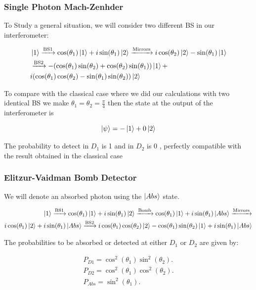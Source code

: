 \documentclass[]{beamer}
\begin{document}
\begin{frame}
\frametitle{Single Photon Mach-Zenhder}


To Study a general situation, we will consider two different BS in our interferometer: 

\begin{align*}
& \ket{1}\xrightarrow{\text{BS1}}\cos(\theta_{1})\ket{1}+i\sin(\theta_{1})\ket{2}\xrightarrow{\text{Mirrors}}i\cos(\theta_{2})\ket{2}-\sin(\theta_{1})\ket{1}\\
&\xrightarrow{\text{BS2}} -(\cos(\theta_{1})\sin(\theta_{2})+\cos(\theta_{2})\sin(\theta_{1}))\ket{1}+\\
& i(\cos(\theta_{1})\cos(\theta_{2})-\sin(\theta_{1})\sin(\theta_{2}))\ket{2} 
\end{align*}


To compare with the classical case where we did our calculations with two identical BS we make $\theta_{1}=\theta_{2}=\frac{\pi}{4}$ then the state at the output of the interferometer is 

\begin{equation}
\ket{\psi}=-\ket{1}+0\ket{2}
\end{equation}

The probability to detect in $D_{1}$ is 1 and in $D_{2}$ is 0 , perfectly compatible with the result obtained in the classical case 

\end{frame}

\begin{frame}
\frametitle{Elitzur-Vaidman Bomb Detector}
We will denote an absorbed photon using the $\ket{Abs}$ state.
  
\begin{align*}
\ket{1}\xrightarrow{\text{BS1}}\cos(\theta_{1})\ket{1}+i\sin(\theta_{1})\ket{2}\xrightarrow{\text{Bomb}}\cos(\theta_{1})\ket{1}+i\sin(\theta_{1})\ket{Abs}\xrightarrow{\text{Mirrors}} \\
 i\cos(\theta_{1})\ket{2}+i\sin(\theta_{1})\ket{Abs}\xrightarrow{\text{BS2}}i\cos(\theta_{1})\cos(\theta_{2})\ket{2}-\cos(\theta_{1})\sin(\theta_{2})\ket{1}+i\sin(\theta_{1})\ket{Abs} 
\end{align*}

The probabilities to be absorbed or detected at either $D_{1}$ or $D_{2}$ are given by:

\begin{align}
P_{D1}=\cos^2(\theta_{1}) \sin^2(\theta_{2}) .\\
P_{D2}=\cos^2(\theta_{1}) \cos^2(\theta_{2}).\\
P_{Abs}=\sin^2(\theta_{1}).\\
\end{align}

\end{frame}
\end{document}

